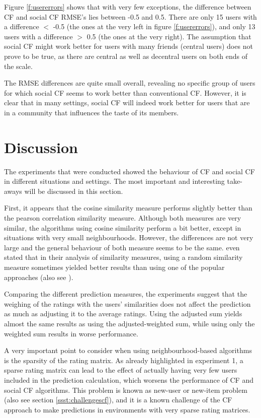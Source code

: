 Figure \ref{f:usererrors} shows that with very few exceptions, the difference between CF and social CF RMSE's lies between -0.5 and 0.5. There are only 15 users with a difference $<$ -0.5 (the ones at the very left in figure \ref{f:usererrors}), and only 13 users with a difference $>$ 0.5 (the ones at the very right). The assumption that social CF might work better for users with many friends (central users) does not prove to be true, as there are central as well as decentral users on both ends of the scale.

The RMSE differences are quite small overall, revealing no specific group of users for which social CF seems to work better than conventional CF. However, it is clear that in many settings, social CF will indeed work better for users that are in a community that influences the taste of its members.
\section{Discussion}
\label{st:discussion} The experiments that were conducted showed the behaviour of CF and social CF in different situations and settings. The most important and interesting take-aways will be discussed in this section.
\newline

First, it appears that the cosine similarity measure performs slightly better than the pearson correlation similarity measure. Although both measures are very similar, the algorithms using cosine similarity perform a bit better, except in situations with very small neighbourhoods. However, the differences are not very large and the general behaviour of both measure seems to be the same. \cite{Lathia_2008} even stated that in their analysis of similarity measures, using a random similarity measure sometimes yielded better results than using one of the popular approaches (also see \cite{Amatriain_2011}).

Comparing the different prediction measures, the experiments suggest that the weighing of the ratings with the users' similarities does not affect the prediction as much as adjusting it to the average ratings. Using the adjusted sum yields almost the same results as using the adjusted-weighted sum, while using only the weighted sum results in worse performance.

A very important point to consider when using neighbourhood-based algorithms is the sparsity of the rating matrix. As already highlighted in experiment 1, a sparse rating matrix can lead to the effect of actually having very few users included in the prediction calculation, which worsens the performance of CF and social CF algorithms. This problem is known as new-user or new-item problem (also see section \ref{ssst:challengescf}), and it is a known challenge of the CF approach to make predictions in environments with very sparse rating matrices.

